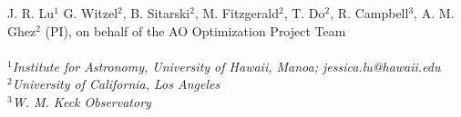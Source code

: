 J. R. Lu${}^1$
G. Witzel${}^2$,
B. Sitarski${}^2$,
M. Fitzgerald${}^2$,
T. Do${}^2$,
R. Campbell${}^3$,
A. M. Ghez${}^2$ (PI),
on behalf of the AO Optimization Project Team
\\
\\
${}^1${\em Institute for Astronomy, University of Hawaii, Manoa; jessica.lu@hawaii.edu}
\\
${}^2${\em University of California, Los Angeles}
\\
${}^3${\em W. M. Keck Observatory}

